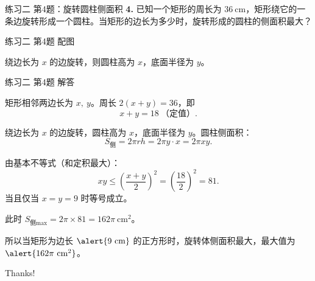 \documentclass[10pt,aspectratio=169,serif]{beamer}
\begin{document}
\begin{frame}[t]{练习二 第4题：旋转圆柱侧面积}
\textbf{4.} 已知一个矩形的周长为 $36\ \mathrm{cm}$，矩形绕它的一条边旋转形成一个圆柱。当矩形的边长为多少时，旋转形成的圆柱的侧面积最大？
\end{frame}

\begin{frame}[t]{练习二 第4题 配图}
\begin{center}
\end{center}
\vspace{0.3em}
{\small 绕边长为 $x$ 的边旋转，则圆柱高为 $x$，底面半径为 $y$。}
\end{frame}

\begin{frame}[t]{练习二 第4题 解答}
\begin{tcolorbox}[colback=orange!10,colframe=orange,title=\textbf{解}]
矩形相邻两边长为 $x,\ y$。周长 $2(x+y)=36$，即
\[
x+y=18\ \text{（定值）}.
\]

绕边长为 $x$ 的边旋转，圆柱高为 $x$，底面半径为 $y$。圆柱侧面积：
\[
S_{\text{侧}}=2\pi r h=2\pi y\cdot x=2\pi xy.
\]

由基本不等式（和定积最大）：
\[
xy\le \left(\frac{x+y}{2}\right)^2=\left(\frac{18}{2}\right)^2=81.
\]
当且仅当 $x=y=9$ 时等号成立。

此时 $S_{\text{侧}\max}=2\pi\times 81=162\pi\ \mathrm{cm^2}$。

\vspace{0.3em}
所以当矩形为边长 $\alert{9\ \mathrm{cm}}$ 的正方形时，旋转体侧面积最大，最大值为 $\alert{162\pi\ \mathrm{cm^2}}$。
\end{tcolorbox}
\end{frame}

\begin{frame}[c]
  \begin{center}
    {\Huge\calligra Thanks!}
  \end{center}
\end{frame}
\end{document}
